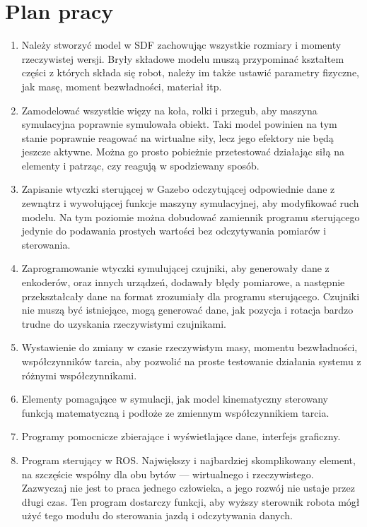 \section{Plan pracy}
\begin{enumerate}
 \item Należy stworzyć model w SDF zachowując wszystkie rozmiary i momenty rzeczywistej wersji.
Bryły składowe modelu muszą przypominać kształtem części z których składa się robot, należy im także ustawić parametry fizyczne, jak masę, moment bezwładności, materiał itp.

\item Zamodelować wszystkie więzy na koła, rolki i przegub, aby maszyna symulacyjna poprawnie symulowała obiekt.
Taki model powinien na tym stanie poprawnie reagować na wirtualne siły, lecz jego efektory nie będą jeszcze aktywne.
Można go prosto pobieżnie przetestować działając siłą na elementy i patrząc, czy reagują w spodziewany sposób.

\item Zapisanie wtyczki sterującej w Gazebo odczytującej odpowiednie dane z zewnątrz i wywołującej funkcje maszyny symulacyjnej, aby modyfikować ruch modelu.
Na tym poziomie można dobudować zamiennik programu sterującego jedynie do podawania prostych wartości bez odczytywania pomiarów i sterowania.

\item Zaprogramowanie wtyczki symulującej czujniki, aby generowały dane z enkoderów, oraz innych urządzeń, dodawały błędy pomiarowe, a następnie przekształcały dane na format zrozumiały dla programu sterującego.
Czujniki nie muszą być istniejące, mogą generować dane, jak pozycja i rotacja bardzo trudne do uzyskania rzeczywistymi czujnikami.

\item Wystawienie do zmiany w czasie rzeczywistym masy, momentu bezwładności, współczynników tarcia, aby pozwolić na proste testowanie działania systemu z różnymi współczynnikami.

\item Elementy pomagające w symulacji, jak model kinematyczny sterowany funkcją matematyczną i podłoże ze zmiennym współczynnikiem tarcia.

\item Programy pomocnicze zbierające i wyświetlające dane, interfejs graficzny.

\item Program sterujący w ROS. Największy i najbardziej skomplikowany element, na szczęście wspólny dla obu bytów --- wirtualnego i rzeczywistego.
Zazwyczaj nie jest to praca jednego człowieka, a jego rozwój nie ustaje przez długi czas.
Ten program dostarczy funkcji, aby wyższy sterownik robota mógł użyć tego modułu do sterowania jazdą i odczytywania danych.
\end{enumerate}

